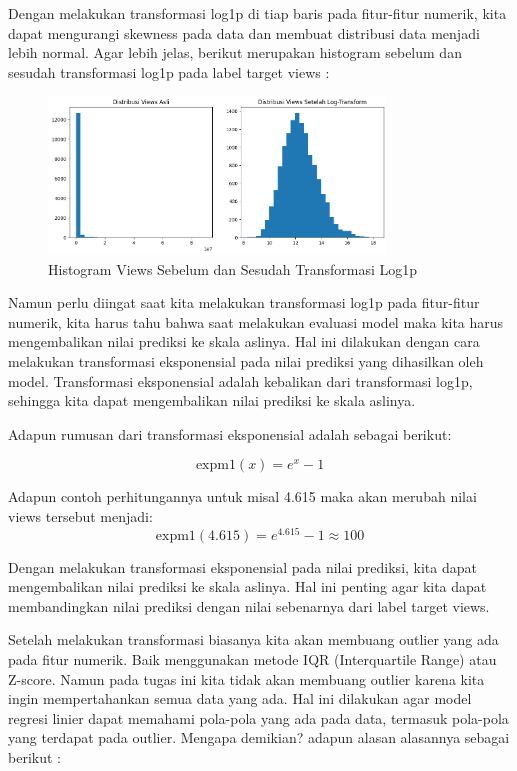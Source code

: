\newpage
Dengan melakukan transformasi log1p di tiap baris pada fitur-fitur numerik, kita dapat mengurangi skewness pada data dan membuat distribusi data menjadi lebih normal. Agar lebih jelas, berikut merupakan histogram sebelum dan sesudah transformasi log1p pada label target views :

\begin{figure}[ht]
    \centering
    \includegraphics[width=0.8\textwidth]{gambar/logviews.png}
    \caption{Histogram Views Sebelum dan Sesudah Transformasi Log1p}
    \label{fig:histogram_views}
\end{figure}

Namun perlu diingat saat kita melakukan transformasi log1p pada fitur-fitur numerik, kita harus tahu bahwa saat melakukan evaluasi model maka kita harus mengembalikan nilai prediksi ke skala aslinya. Hal ini dilakukan dengan cara melakukan transformasi eksponensial pada nilai prediksi yang dihasilkan oleh model. Transformasi eksponensial adalah kebalikan dari transformasi log1p, sehingga kita dapat mengembalikan nilai prediksi ke skala aslinya.

Adapun rumusan dari transformasi eksponensial adalah sebagai berikut:

\begin{equation}
    \text{expm1}(x) = e^x - 1
\end{equation}

Adapun contoh perhitungannya untuk misal 4.615 maka akan merubah nilai views tersebut menjadi:
\begin{equation}
    \text{expm1}(4.615) = e^{4.615} - 1 \approx 100
\end{equation}

Dengan melakukan transformasi eksponensial pada nilai prediksi, kita dapat mengembalikan nilai prediksi ke skala aslinya. Hal ini penting agar kita dapat membandingkan nilai prediksi dengan nilai sebenarnya dari label target views.

Setelah melakukan transformasi biasanya kita akan membuang outlier yang ada pada fitur numerik. Baik menggunakan metode IQR (Interquartile Range) atau Z-score. Namun pada tugas ini kita tidak akan membuang outlier karena kita ingin mempertahankan semua data yang ada. Hal ini dilakukan agar model regresi linier dapat memahami pola-pola yang ada pada data, termasuk pola-pola yang terdapat pada outlier. Mengapa demikian? adapun alasan alasannya sebagai berikut :

